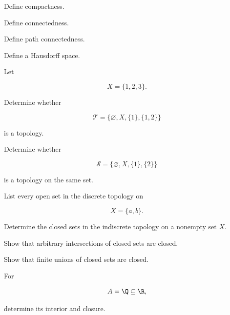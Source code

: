 \begin{exercise}[1]
Define compactness.
\end{exercise}

\begin{exercise}[1]
Define connectedness.
\end{exercise}

\begin{exercise}[1]
Define path connectedness.
\end{exercise}

\begin{exercise}[1]
Define a Hausdorff space.
\end{exercise}

\begin{exercise}[2]
Let

\[
X=\{1,2,3\}.
\]

Determine whether

\[
\mathcal{T}
=
\{
\varnothing,
X,
\{1\},
\{1,2\}
\}
\]

is a topology.
\end{exercise}

\begin{exercise}[2]
Determine whether

\[
\mathcal{S}
=
\{
\varnothing,
X,
\{1\},
\{2\}
\}
\]

is a topology on the same set.
\end{exercise}

\begin{exercise}[2]
List every open set in the discrete topology on

\[
X=\{a,b\}.
\]
\end{exercise}

\begin{exercise}[2]
Determine the closed sets in the indiscrete topology on a nonempty set
\(X\).
\end{exercise}

\begin{exercise}[2]
Show that arbitrary intersections of closed sets are closed.
\end{exercise}

\begin{exercise}[2]
Show that finite unions of closed sets are closed.
\end{exercise}

\begin{exercise}[2]
For

\[
A=\Q\subseteq\R,
\]

determine its interior and closure.
\end{exercise}

